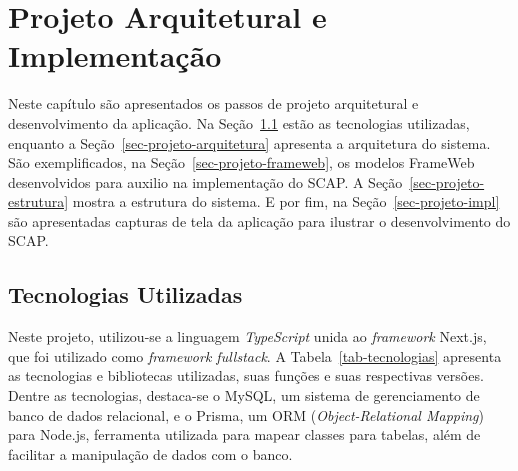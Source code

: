 \chapter{Projeto Arquitetural e Implementação}
\label{chap-projeto}

Neste capítulo
são apresentados os passos de projeto arquitetural e desenvolvimento da aplicação.
Na Seção~\ref{sec-projeto-tecnologias} estão as tecnologias utilizadas, enquanto a Seção~\ref{sec-projeto-arquitetura}
apresenta a arquitetura do sistema. São exemplificados, na Seção~\ref{sec-projeto-frameweb},
os modelos FrameWeb desenvolvidos para auxilio na implementação do SCAP. A Seção~\ref{sec-projeto-estrutura}
mostra a estrutura do sistema. E por fim, na Seção~\ref{sec-projeto-impl} são apresentadas capturas de
tela da aplicação para ilustrar o desenvolvimento do SCAP.



\section{Tecnologias Utilizadas}
\label{sec-projeto-tecnologias}

Neste projeto, utilizou-se a linguagem \textit{TypeScript} unida ao \textit{framework} Next.js, que foi utilizado como \textit{framework fullstack}.
A Tabela~\ref{tab-tecnologias} apresenta as tecnologias e bibliotecas utilizadas, suas funções e suas respectivas versões.
Dentre as tecnologias, destaca-se o MySQL, um sistema de gerenciamento de banco de dados relacional,
e o Prisma, um ORM (\textit{Object-Relational Mapping}) para Node.js, ferramenta utilizada
para mapear classes para tabelas, além de facilitar a manipulação de dados com o banco.

